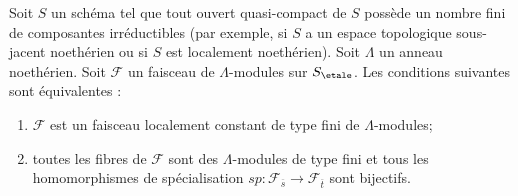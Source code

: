 \begin{lemma}
\label{lemma-characterize-locally-constant-module}
Soit $S$ un schéma tel que tout ouvert quasi-compact de $S$ possède
un nombre fini de composantes irréductibles (par exemple, si $S$ a un
espace topologique sous-jacent noethérien ou si $S$ est localement noethérien).
Soit $\Lambda$ un anneau noethérien.
Soit $\mathcal{F}$ un faisceau de $\Lambda$-modules sur $S_\etale$.
Les conditions suivantes sont équivalentes :
\begin{enumerate}
\item $\mathcal{F}$ est un faisceau localement constant de type fini
de $\Lambda$-modules;
\item toutes les fibres de $\mathcal{F}$ sont des $\Lambda$-modules de type fini et
tous les homomorphismes de spécialisation
$sp : \mathcal{F}_{\overline{s}} \to \mathcal{F}_{\overline{t}}$
sont bijectifs.
\end{enumerate}
\end{lemma}

